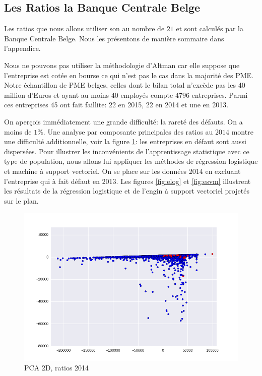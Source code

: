 \documentclass[DIV=calc, paper=a4, fontsize=11pt, twocolumn]{scrartcl}
\begin{document}
\subsection{Les Ratios la Banque Centrale Belge}
Les ratios que nous allons utiliser son au nombre de $21$ et sont calculés par la Banque Centrale Belge. Nous les présentons de manière sommaire dans l'appendice. 

Nous ne pouvons pas utiliser la méthodologie d'Altman car elle suppose que l'entreprise est cotée en bourse ce qui n'est pas le cas dans la majorité des PME.
Notre échantillon de PME belges, celles dont le bilan total n'excède pas les 40 million d'Euros et ayant au moins 40 employés compte $4796$ entreprises. Parmi ces entreprises 45 ont fait faillite: 22 en 2015, 22 en 2014 et une en 2013.

On aperçois immédiatement une grande difficulté: la rareté des défauts. On a moins de $1\%$. 
Une analyse par composante principales des ratios au $2014$ montre une difficulté additionnelle, voir la figure \ref{fig:pca2D}: les entreprises en défaut sont aussi dispersées. Pour illustrer les inconvénients de l'apprentissage statistique avec ce type de population, nous allons lui appliquer les méthodes de régression logistique et machine à support vectoriel. On se place sur les données 2014 en excluant l'entreprise qui à fait défaut en 2013. Les figures \ref{fig:elog} et \ref{fig:esvm} illustrent les résultats de la régression logistique et de l'engin à support vectoriel projetés sur le plan.
\begin{figure}
  \centering
    \includegraphics[width=\linewidth]{pca2D}
  \caption{PCA 2D, ratios 2014}
  \label{fig:pca2D}
\end{figure}
\end{document}
